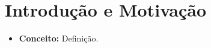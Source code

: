 \documentclass[11pt]{article}
\begin{document}
\section{Introdução e Motivação}

\begin{itemize}
  \item \textbf{Conceito:} Definição.
\end{itemize}
\end{document}
